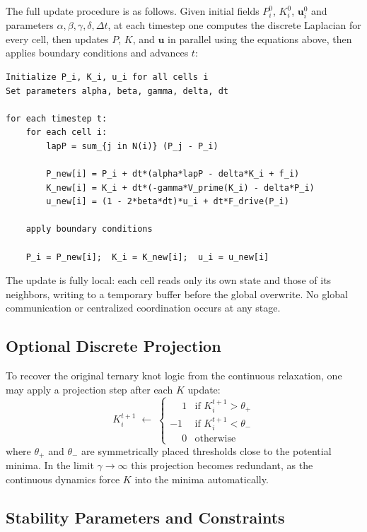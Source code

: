 \documentclass[12pt, a4paper]{article}
\begin{document}
The full update procedure is as follows. Given initial fields $P_i^0$, $K_i^0$, $\mathbf{u}_i^0$ and parameters $\alpha, \beta, \gamma, \delta, \Delta t$, at each timestep one computes the discrete Laplacian for every cell, then updates $P$, $K$, and $\mathbf{u}$ in parallel using the equations above, then applies boundary conditions and advances $t$:

\begin{verbatim}
Initialize P_i, K_i, u_i for all cells i
Set parameters alpha, beta, gamma, delta, dt

for each timestep t:
    for each cell i:
        lapP = sum_{j in N(i)} (P_j - P_i)

        P_new[i] = P_i + dt*(alpha*lapP - delta*K_i + f_i)
        K_new[i] = K_i + dt*(-gamma*V_prime(K_i) - delta*P_i)
        u_new[i] = (1 - 2*beta*dt)*u_i + dt*F_drive(P_i)

    apply boundary conditions

    P_i = P_new[i];  K_i = K_new[i];  u_i = u_new[i]
\end{verbatim}

The update is fully local: each cell reads only its own state and those of its neighbors, writing to a temporary buffer before the global overwrite. No global communication or centralized coordination occurs at any stage.

\subsection{Optional Discrete Projection}

To recover the original ternary knot logic from the continuous relaxation, one may apply a projection step after each $K$ update:
\[
K_i^{t+1} \;\leftarrow\;
\begin{cases}
\phantom{-}1 & \text{if } K_i^{t+1} > \theta_+ \\
-1 & \text{if } K_i^{t+1} < \theta_- \\
\phantom{-}0 & \text{otherwise}
\end{cases}
\]
where $\theta_+$ and $\theta_-$ are symmetrically placed thresholds close to the potential minima. In the limit $\gamma \to \infty$ this projection becomes redundant, as the continuous dynamics force $K$ into the minima automatically.

\subsection{Stability Parameters and Constraints}
\end{document}
